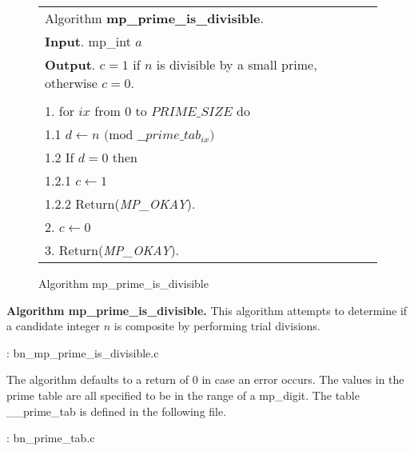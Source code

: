 \documentclass[b5paper]{book}
\begin{document}
\begin{figure}[!here]
\begin{small}
\begin{center}
\begin{tabular}{l}
\hline Algorithm \textbf{mp\_prime\_is\_divisible}. \\
\textbf{Input}.   mp\_int $a$ \\
\textbf{Output}.  $c = 1$ if $n$ is divisible by a small prime, otherwise $c = 0$.  \\
\hline \\
1.  for $ix$ from $0$ to $PRIME\_SIZE$ do \\
\hspace{3mm}1.1  $d \leftarrow n \mbox{ (mod }\_\_prime\_tab_{ix}\mbox{)}$ \\
\hspace{3mm}1.2  If $d = 0$ then \\
\hspace{6mm}1.2.1  $c \leftarrow 1$ \\
\hspace{6mm}1.2.2  Return(\textit{MP\_OKAY}). \\
2.  $c \leftarrow 0$ \\
3.  Return(\textit{MP\_OKAY}). \\
\hline
\end{tabular}
\end{center}
\end{small}
\caption{Algorithm mp\_prime\_is\_divisible}
\end{figure}
\textbf{Algorithm mp\_prime\_is\_divisible.}
This algorithm attempts to determine if a candidate integer $n$ is composite by performing trial divisions.  

\vspace{+3mm}\begin{small}
\hspace{-5.1mm}{\bf File}: bn\_mp\_prime\_is\_divisible.c
\vspace{-3mm}
\begin{alltt}
\end{alltt}
\end{small}

The algorithm defaults to a return of $0$ in case an error occurs.  The values in the prime table are all specified to be in the range of a 
mp\_digit.  The table \_\_prime\_tab is defined in the following file.

\vspace{+3mm}\begin{small}
\hspace{-5.1mm}{\bf File}: bn\_prime\_tab.c
\vspace{-3mm}
\begin{alltt}
\end{alltt}
\end{small}
\end{document}
